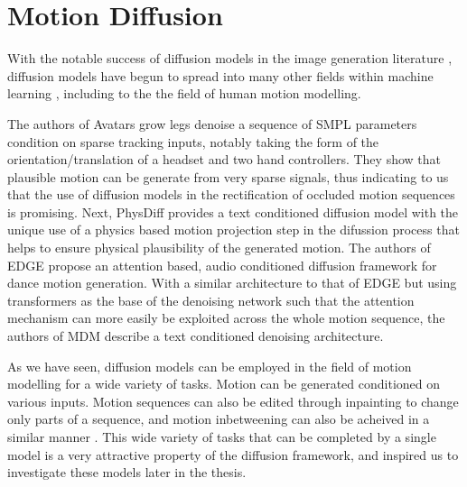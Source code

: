 \section{Motion Diffusion}

With the notable success of diffusion models in the image generation literature \cite{ddpm, diffusion_beats_gans, stable_diffusion}, diffusion models have begun to spread into many other fields within machine learning \cite{diffusion_review}, including to the the field of human motion modelling.


The authors of Avatars grow legs \cite{AvatarsGrowLegs} denoise a sequence of SMPL \cite{SMPL} parameters condition on sparse tracking inputs, notably taking the form of the orientation/translation of a headset and two hand controllers. They show that plausible motion can be generate from very sparse signals, thus indicating to us that the use of diffusion models in the rectification of occluded motion sequences is promising. Next, PhysDiff \cite{PhysDiff} provides a text conditioned diffusion model with the unique use of a physics based motion projection step in the difussion process that helps to ensure physical plausibility of the generated motion. The authors of EDGE \cite{EDGE} propose an attention based, audio conditioned diffusion framework for dance motion generation. With a similar architecture to that of EDGE \cite{EDGE} but using transformers as the base of the denoising network such that the attention mechanism can more easily be exploited across the whole motion sequence, the authors of MDM \cite{MDM} describe a text conditioned denoising architecture.

As we have seen, diffusion models can be employed in the field of motion modelling for a wide variety of tasks. Motion can be generated \cite{MDM, EDGE, AvatarsGrowLegs} conditioned on various inputs. Motion sequences can also be edited through inpainting \cite{diffusion_inpainting, MDM} to change only parts of a sequence, and motion inbetweening can also be acheived in a similar manner \cite{MDM}. This wide variety of tasks that can be completed by a single model is a very attractive property of the diffusion framework, and inspired us to investigate these models later in the thesis.